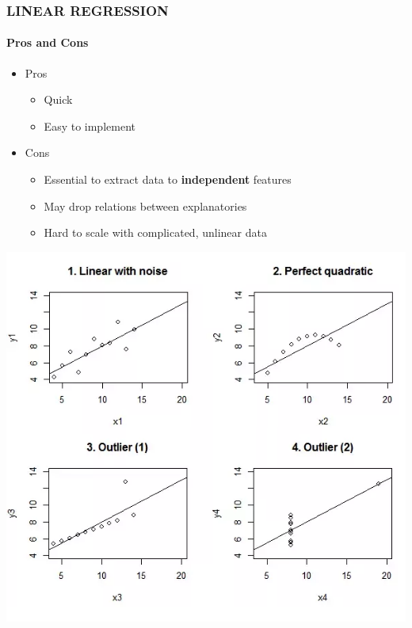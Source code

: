 \documentclass[11pt]{beamer}
\begin{document}
\begin{frame}
	\frametitle{\textbf{LINEAR REGRESSION}}
	\framesubtitle{Pros and Cons}
	\begin{minipage}[c]{0.5\textwidth}
	\begin{itemize}
		\item Pros
		\begin{itemize}
			\pause
			\item Quick
			\pause
			\item Easy to implement	
			\pause
		\end{itemize}
		\item Cons 
			\pause
		\begin{itemize}
			\item Essential to extract data to \textbf{independent} features
			\pause
			\item May drop relations between explanatories
			\pause
			\item Hard to scale with complicated, unlinear data
		\end{itemize}
	\end{itemize}
	\end{minipage}
	\begin{minipage}[c]{0.4\textwidth}
	\begin{center}
		\includegraphics[width=\textwidth]{unLR.png}	
	\end{center}
		\end{minipage}
\end{frame}
\end{document}
